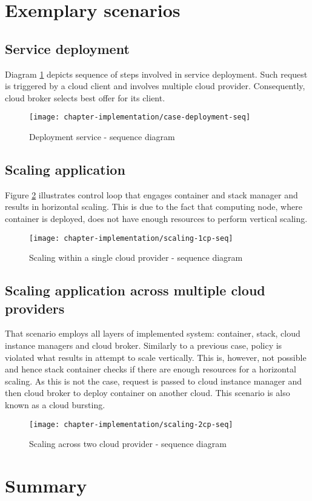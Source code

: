 \newpage
\section{Exemplary scenarios}

\subsection{Service deployment}
Diagram \ref{fig:case-deployment-seq} depicts sequence of steps involved in service deployment. Such request is triggered by a cloud client and involves multiple cloud provider. Consequently, cloud broker selects best offer for its client.

\begin{figure}[!ht]
  \begin{center}
    \texttt{[image: chapter-implementation/case-deployment-seq]}
  \end{center}
  \caption{Deployment service - sequence diagram}
  \label{fig:case-deployment-seq}
\end{figure}

\subsection{Scaling application}
Figure \ref{fig:scaling-1cp-seq} illustrates control loop that engages container and stack manager and results in horizontal scaling. This is due to the fact that computing node, where container is deployed, does not have enough resources to perform vertical scaling.

\begin{figure}[!ht]
  \begin{center}
    \texttt{[image: chapter-implementation/scaling-1cp-seq]}
  \end{center}
  \caption{Scaling within a single cloud provider - sequence diagram}
  \label{fig:scaling-1cp-seq}
\end{figure}

\subsection{Scaling application across multiple cloud providers}
That scenario employs all layers of implemented system: container, stack, cloud instance managers and cloud broker. Similarly to a previous case, policy is violated what results in attempt to scale vertically. This is, however, not possible and hence stack container checks if there are enough resources for a horizontal scaling. As this is not the case, request is passed to cloud instance manager and then cloud broker to deploy container on another cloud. This scenario is also known as a cloud bursting.

\begin{figure}[!ht]
  \begin{center}
    \texttt{[image: chapter-implementation/scaling-2cp-seq]}
  \end{center}
  \caption{Scaling across two cloud provider - sequence diagram}
  \label{fig:scaling-2cp-seq}
\end{figure}

\newpage
\section{Summary}

